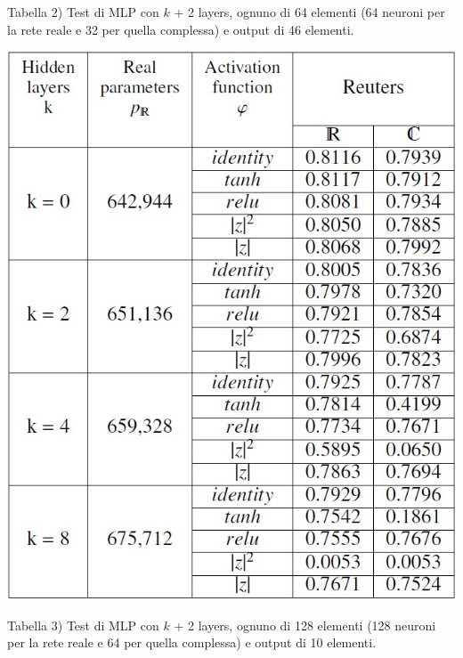 \documentclass[a4paper,10pt]{article}
\begin{document}
Tabella 2) Test di MLP con $k$ + 2 layers, ognuno di 64 elementi (64 neuroni per la rete reale e 32 per quella complessa) e output di 46 elementi.

\includegraphics[width=%
\textwidth]{tabella2}


Tabella 3) Test di MLP con $k$ + 2 layers, ognuno di 128 elementi (128 neuroni per la rete reale e 64 per quella complessa) e output di 10 elementi.
\end{document}
